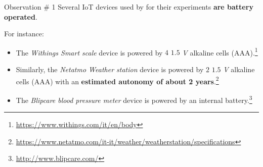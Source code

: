 \documentclass[10pt]{beamer}
\begin{document}
\begin{frame}{}

\begin{block}{Observation \# 1}
Several IoT devices used by \citet{ITPAReport} for their experiments \textbf{are battery operated}. 

For instance:

\begin{itemize}
\item The \textit{Withings Smart scale} device is powered by $4$ $1.5$ \textit{V} alkaline cells (AAA).\footnote{\url{https://www.withings.com/it/en/body}}

\item Similarly, the \textit{Netatmo Weather station} device is powered by $2$ $1.5$ \textit{V} alkaline cells (AAA) with an \textbf{estimated autonomy of about 2 years}.\footnote{\url{https://www.netatmo.com/it-it/weather/weatherstation/specifications}
}
\item The \textit{Blipcare blood pressure meter} device is powered by an internal battery.\footnote{\url{http://www.blipcare.com/}}
\end{itemize} 

\end{block}

\end{frame} 
\end{document}
